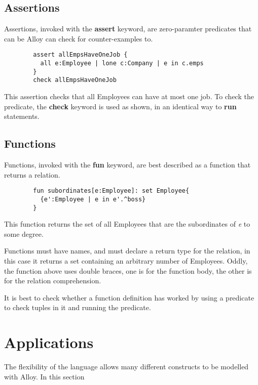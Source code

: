 \documentclass[10pt]{article}
\begin{document}
    \subsection*{Assertions}
      Assertions, invoked with the \textbf{assert} keyword, are zero-paramter predicates that can be Alloy can check for counter-examples to.
      \begin{lstlisting}
        assert allEmpsHaveOneJob {
          all e:Employee | lone c:Company | e in c.emps
        }
        check allEmpsHaveOneJob
      \end{lstlisting}\par
      This assertion checks that all Employees can have at most one job. To check the predicate, the \textbf{check} keyword is used as shown, in an identical way to \textbf{run} statements.
    \subsection*{Functions}
      Functions, invoked with the \textbf{fun} keyword, are best described as a function that returns a relation.
      \begin{lstlisting}
        fun subordinates[e:Employee]: set Employee{
          {e':Employee | e in e'.^boss}
        }
      \end{lstlisting}\par
      This function returns the set of all Employees that are the subordinates of \textit{e} to some degree.\par
      Functions must have names, and must declare a return type for the relation, in this case it returns a set containing an arbitrary number of Employees. Oddly, the function above uses double braces, one is for the function body, the other is for the relation comprehension.\par
      It is best to check whether a function definition has worked by using a predicate to check tuples in it and running the predicate.

  \section*{Applications}
    The flexibility of the language allows many different constructs to be modelled with Alloy. In this section
\end{document}

